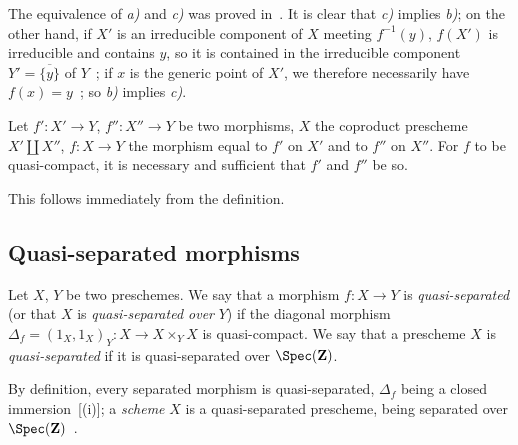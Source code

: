 The equivalence of \emph{a)} and \emph{c)} was proved in~. It is clear that \emph{c)}
implies \emph{b)}; on the other hand, if $X'$ is an irreducible component of $X$ meeting $f^{-1}(y)$,
$f(X')$ is irreducible and contains $y$, so it is contained in the irreducible component
$Y'=\overline{\{y\}}$ of $Y$~; if $x$ is the generic point of $X'$, we therefore necessarily have
$f(x)=y$~; so \emph{b)} implies \emph{c)}.

\begin{proposition}[1.1.6]
\label{IV.1.1.6}
Let $f':X'\to Y$, $f'':X''\to Y$ be two morphisms, $X$ the coproduct prescheme
$X'\coprod X''$, $f:X\to Y$ the morphism equal to $f'$ on $X'$ and to $f''$ on $X''$. For $f$ to be
quasi-compact, it is necessary and sufficient that $f'$ and $f''$ be so.
\end{proposition}

This follows immediately from the definition.

\subsection{Quasi-separated morphisms}
\label{subsection:IV.1.2}

\begin{definition}[1.2.1]
\label{IV.1.2.1}
Let $X$, $Y$ be two preschemes. We say that a morphism $f:X\to Y$ is
\emph{quasi-separated} (or that $X$ is \emph{quasi-separated over} $Y$) if the diagonal morphism $\Delta_f=(1_X,1_X)_Y:X\to X\times_Y X$
is quasi-compact. We say that a prescheme $X$ is \emph{quasi-separated} if it is quasi-separated over $\Spec(\mathbf{Z})$.
\end{definition}

By definition, every separated morphism is quasi-separated, $\Delta_f$ being a closed immersion~[(i)]; a \emph{scheme} $X$ is a quasi-separated prescheme, being separated over
$\Spec(\mathbf{Z})$~.

